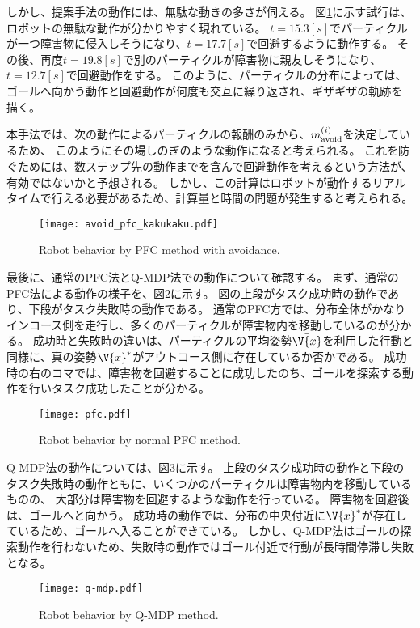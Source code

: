 しかし、提案手法の動作には、無駄な動きの多さが伺える。
図\ref{fig:avoid pfc kakukaku}に示す試行は、ロボットの無駄な動作が分かりやすく現れている。
$t=15.3[\si{s}]$でパーティクルが一つ障害物に侵入しそうになり、$t=17.7[\si{s}]$で回避するように動作する。
その後、再度$t=19.8[\si{s}]$で別のパーティクルが障害物に親友しそうになり、$t=12.7[\si{s}]$で回避動作をする。
このように、パーティクルの分布によっては、ゴールへ向かう動作と回避動作が何度も交互に繰り返され、ギザギザの軌跡を描く。

本手法では、次の動作によるパーティクルの報酬のみから、$m^{(i)}_{\rm avoid}$を決定しているため、
このようにその場しのぎのような動作になると考えられる。
これを防ぐためには、数ステップ先の動作までを含んで回避動作を考えるという方法が、有効ではないかと予想される。
しかし、この計算はロボットが動作するリアルタイムで行える必要があるため、計算量と時間の問題が発生すると考えられる。

\begin{figure}[tbp]
  \begin{center}
    \texttt{[image: avoid\_pfc\_kakukaku.pdf]}
    \caption{Robot behavior by PFC method with avoidance.}
    \label{fig:avoid pfc kakukaku}
  \end{center}
\end{figure}

最後に、通常のPFC法とQ-MDP法での動作について確認する。
まず、通常のPFC法による動作の様子を、図\ref{fig:pfc}に示す。
図の上段がタスク成功時の動作であり、下段がタスク失敗時の動作である。
通常のPFC方では、分布全体がかなりインコース側を走行し、多くのパーティクルが障害物内を移動しているのが分かる。
成功時と失敗時の違いは、パーティクルの平均姿勢$\bar{\V{x}}$を利用した行動と同様に、真の姿勢$\V{x}^{*}$がアウトコース側に存在しているか否かである。
成功時の右のコマでは、障害物を回避することに成功したのち、ゴールを探索する動作を行いタスク成功したことが分かる。

\begin{figure}[tbp]
  \begin{center}
    \texttt{[image: pfc.pdf]}
    \caption{Robot behavior by normal PFC method.}
    \label{fig:pfc}
  \end{center}
\end{figure}

Q-MDP法の動作については、図\ref{fig:q-mdp}に示す。
上段のタスク成功時の動作と下段のタスク失敗時の動作ともに、いくつかのパーティクルは障害物内を移動しているものの、
大部分は障害物を回避するような動作を行っている。
障害物を回避後は、ゴールへと向かう。
成功時の動作では、分布の中央付近に$\V{x}^{*}$が存在しているため、ゴールへ入ることができている。
しかし、Q-MDP法はゴールの探索動作を行わないため、失敗時の動作ではゴール付近で行動が長時間停滞し失敗となる。

\begin{figure}[tbp]
  \begin{center}
    \texttt{[image: q-mdp.pdf]}
    \caption{Robot behavior by Q-MDP method.}
    \label{fig:q-mdp}
  \end{center}
\end{figure}

